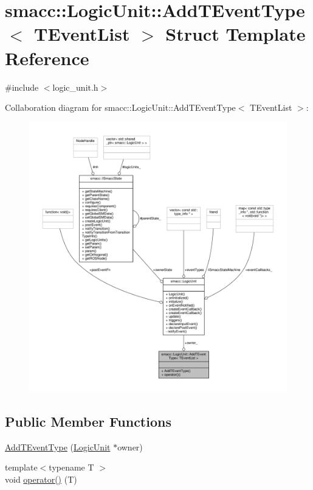 \hypertarget{structsmacc_1_1LogicUnit_1_1AddTEventType}{}\section{smacc\+:\+:Logic\+Unit\+:\+:Add\+T\+Event\+Type$<$ T\+Event\+List $>$ Struct Template Reference}
\label{structsmacc_1_1LogicUnit_1_1AddTEventType}


{\ttfamily \#include $<$logic\+\_\+unit.\+h$>$}



Collaboration diagram for smacc\+:\+:Logic\+Unit\+:\+:Add\+T\+Event\+Type$<$ T\+Event\+List $>$\+:\nopagebreak
\begin{figure}[H]
\begin{center}
\leavevmode
\includegraphics[width=350pt]{structsmacc_1_1LogicUnit_1_1AddTEventType__coll__graph}
\end{center}
\end{figure}
\subsection*{Public Member Functions}
\begin{DoxyCompactItemize}
\item 
\hyperlink{structsmacc_1_1LogicUnit_1_1AddTEventType_a9eaeba0a2daf1ef60b96cee216f9383d}{Add\+T\+Event\+Type} (\hyperlink{classsmacc_1_1LogicUnit}{Logic\+Unit} $\ast$owner)
\item 
{\footnotesize template$<$typename T $>$ }\\void \hyperlink{structsmacc_1_1LogicUnit_1_1AddTEventType_a597bfed7ec443692a312a5dec3848a09}{operator()} (T)
\end{DoxyCompactItemize}
